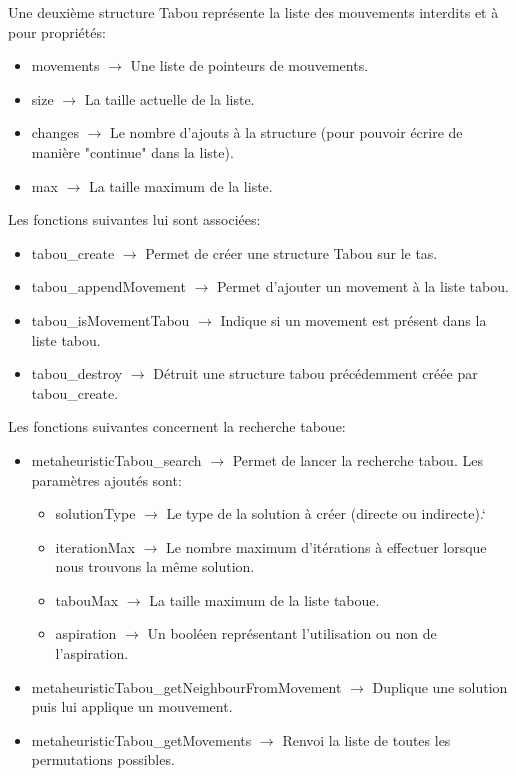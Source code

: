 \documentclass{EPUProjetPeiP}
\begin{document}
Une deuxième structure Tabou représente la liste des mouvements interdits et à pour propriétés:
\begin{itemize}
	\item movements $\longrightarrow$ Une liste de pointeurs de mouvements.
	\item size $\longrightarrow$ La taille actuelle de la liste.
	\item changes $\longrightarrow$ Le nombre d'ajouts à la structure (pour pouvoir écrire de manière "continue" dans la liste).
	\item max $\longrightarrow$ La taille maximum de la liste.\\
\end{itemize}

Les fonctions suivantes lui sont associées:
\begin{itemize}
	\item tabou\_create $\longrightarrow$ Permet de créer une structure Tabou sur le tas.
	\item tabou\_appendMovement $\longrightarrow$ Permet d'ajouter un movement à la liste tabou.
	\item tabou\_isMovementTabou $\longrightarrow$ Indique si un movement est présent dans la liste tabou.
	\item tabou\_destroy $\longrightarrow$ Détruit une structure tabou précédemment créée par tabou\_create.\\
\end{itemize}

Les fonctions suivantes concernent la recherche taboue:
\begin{itemize}
	\item metaheuristicTabou\_search $\longrightarrow$ Permet de lancer la recherche tabou. Les paramètres ajoutés sont:
	\begin{itemize}
		\item solutionType $\longrightarrow$ Le type de la solution à créer (directe ou indirecte).`
		\item iterationMax $\longrightarrow$ Le nombre maximum d'itérations à effectuer lorsque nous trouvons la même solution.
		\item tabouMax $\longrightarrow$ La taille maximum de la liste taboue.
		\item aspiration $\longrightarrow$ Un booléen représentant l'utilisation ou non de l'aspiration.
	\end{itemize}
	\item metaheuristicTabou\_getNeighbourFromMovement $\longrightarrow$ Duplique une solution puis lui applique un mouvement.
	\item metaheuristicTabou\_getMovements $\longrightarrow$ Renvoi la liste de toutes les permutations possibles.
\end{itemize}
\end{document}
